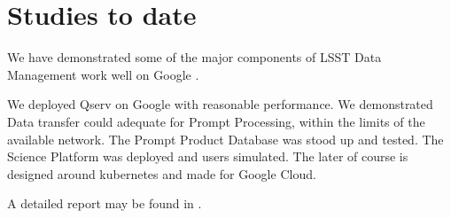 \section{Studies to date}
We have demonstrated some of the major components of \gls{LSST} \gls{Data Management} work well on Google  .

We deployed \gls{Qserv} on Google with reasonable performance.
We demonstrated Data transfer  could adequate for \gls{Prompt Processing}, within the limits of the available network.
The Prompt Product Database was  stood up and tested.  The  \gls{Science Platform} was deployed and users simulated.
The later of course is designed around kubernetes and made for Google Cloud.

A detailed report may be found in .


